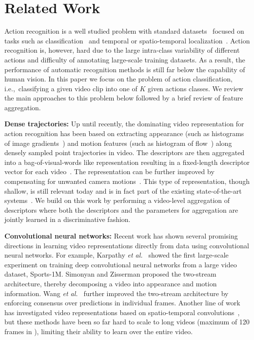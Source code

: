 \documentclass[10pt,twocolumn,letterpaper]{article}
\newcommand{\etalWspace}[0]{{\it et al.\ }}
\begin{document}
 \section{Related Work}




Action recognition is a well studied problem with standard datasets~\cite{youtube8M,2016trecvidawad,THUMOS15,hmdb51,charades,ucf101} focused on tasks
such as classification~\cite{Feichtenhofer_16,Simonyan_14b,IDT_Wang_13,WangL_16a,WangX_16a} and
temporal or spatio-temporal localization~\cite{Kang_16,Weinzaepfel_15,Yeung_15}. 
Action recognition is, however, hard due to the large intra-class variability of different actions and difficulty of annotating large-scale training datasets. As a result, the performance of automatic recognition methods is still far below the capability of human vision. In this paper we focus on the problem of action classification, i.e.,\ classifying a given video clip into one of $K$ given actions classes. We review the main approaches to this problem below followed by a brief review of feature aggregation.


{\bf Dense trajectories:}
Up until recently, the dominating video representation for action recognition has been based on extracting
appearance (such as histograms of image gradients~\cite{Dalal05}) and motion features (such as histogram of flow~\cite{Dalal06})
along densely sampled point trajectories in video. The descriptors are then aggregated into a bag-of-visual-words like representation resulting in a fixed-length descriptor vector for each video~\cite{WangCVPR11,WangBMVC09}. The representation can be further improved by compensating for unwanted camera motions~\cite{IDT_Wang_13}. 
This type of representation, though shallow, is still relevant today and is in fact 
part of the existing state-of-the-art systems~\cite{Feichtenhofer_16,Varol_16,WangL_15a}.
We build on this work by performing a video-level aggregation of descriptors
where both the descriptors and the parameters
for aggregation are jointly learned in
a discriminative fashion.



{\bf Convolutional neural networks:}
Recent work has shown several promising directions in learning video representations directly from data using convolutional neural networks.
For example, Karpathy \etalWspace\cite{Karpathy_14} showed the first large-scale
experiment on training deep convolutional neural networks from a large video
dataset, Sports-1M. Simonyan and Zisserman\cite{Simonyan_14b}
proposed the two-stream architecture, thereby
decomposing a video into appearance and motion information.
Wang \etalWspace\cite{WangL_16a} further improved the two-stream architecture
by
enforcing consensus over predictions in individual frames.
Another line of work has investigated video representations based on spatio-temporal convolutions~\cite{Tran_15,Varol_16}, but these methods have been so far hard to scale to long videos (maximum of 120 frames in \cite{Varol_16}), limiting their ability to learn
over the entire video.
\end{document}
